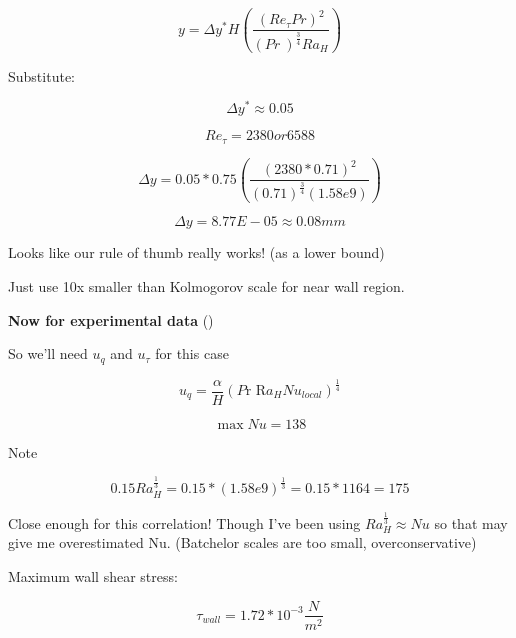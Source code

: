 \documentclass[12pt]{article}
\renewcommand{\_}{\kern-1.5pt\textunderscore\kern-1.5pt}
\begin{document}
 \[ y= \Delta y^{\ast}H \left( \frac{ \left( Re_{ \tau}Pr \right) ^{2}}{ \left( Pr~ \right) ^{\frac{3}{4}}Ra_{H}} \right)  \] \par

Substitute:\par

 \[  \Delta y^{\ast} \approx 0.05 \] \par

 \[ Re_{ \tau}=2380 or 6588 \] \par

 \[  \Delta y=0.05\ast0.75 \left( \frac{ \left( 2380\ast0.71 \right) ^{2}}{ \left( 0.71 \right) ^{\frac{3}{4}} \left( 1.58e9 \right) } \right)  \] \par

 \[  \Delta y=8.77E-05 \approx 0.08 mm \] \par

Looks like our rule of thumb really works! (as a lower bound)\par

Just use 10x smaller than Kolmogorov scale for near wall region.\par


\vspace{\baselineskip}
\textbf{Now for experimental data} (\cite{Ampofo2003})\par

So we’ll need  \( u_{q} \)  and  \( u_{ \tau} \)  for this case\par

 \[ u_{q}=\frac{ \alpha }{H} \left( P\text{r R}a_{H}Nu_{local} \right) ^{\frac{1}{4}} \] \par

 \[ \max Nu=138 \] \par

Note\par

 \[ 0.15Ra_{H}^{\frac{1}{3}}=0.15\ast \left( 1.58e9 \right) ^{\frac{1}{3}}=0.15\ast1164=175 \] \par

Close enough for this correlation! Though I’ve been using  \( Ra_{H}^{\frac{1}{3}} \approx Nu \)  so that may give me overestimated Nu. (Batchelor scales are too small, overconservative)\par

 Maximum wall shear stress:\par

 \[  \tau_{wall}=1.72\ast10^{-3}\frac{N}{m^{2}} \] \par
\end{document}
